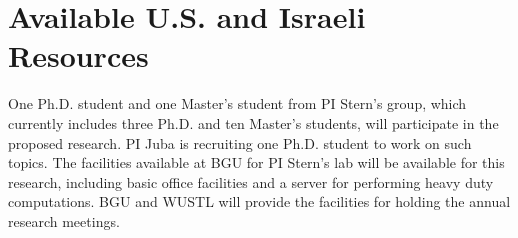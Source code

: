 \documentclass[12pt]{article}
\newcommand{\note}[1]{\textbf{\textit{#1}}}
\begin{document}
\vspace{-0.35cm}
\section{Available U.S. and Israeli Resources}
One Ph.D. student and one Master’s student from PI Stern’s group, which currently includes three Ph.D. and ten Master's students, will participate in the proposed research. PI Juba is recruiting one Ph.D. student to work on such topics.
The facilities available at BGU for PI Stern’s
lab will be available for this research, including basic office facilities and a server for performing heavy duty computations. BGU and WUSTL will provide the facilities for holding the annual research meetings.




\pagebreak


\end{document}
